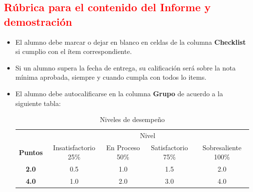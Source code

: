 \documentclass{article}
\begin{document}
	\clearpage
	
	\subsection{\textcolor{red}{Rúbrica para el contenido del Informe y demostración}}
	\begin{itemize}			
		\item El alumno debe marcar o dejar en blanco en celdas de la columna \textbf{Checklist} si cumplio con el ítem correspondiente.
		\item Si un alumno supera la fecha de entrega,  su calificación será sobre la nota mínima aprobada, siempre y cuando cumpla con todos lo items.
		\item El alumno debe autocalificarse en la columna \textbf{Grupo} de acuerdo a la siguiente tabla:
	
		\begin{table}[ht]
			\caption{Niveles de desempeño}
			\begin{center}
			\begin{tabular}{ccccc}
    			\hline
    			 & \multicolumn{4}{c}{Nivel}\\
    			\cline{1-5}
    			\textbf{Puntos} & Insatisfactorio 25\%& En Proceso 50\% & Satisfactorio 75\% & Sobresaliente 100\%\\
    			\textbf{2.0}&0.5&1.0&1.5&2.0\\
    			\textbf{4.0}&1.0&2.0&3.0&4.0\\
    		\hline
			\end{tabular}
		\end{center}
	\end{table}	
	
	\end{itemize}
	
\end{document}

